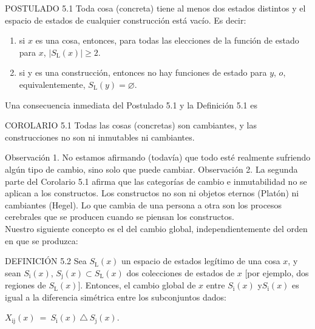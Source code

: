 \begin{justifying}
    \bigskip

    \noindent POSTULADO 5.1 Toda cosa (concreta) tiene al menos dos estados distintos y 
    el espacio de estados de cualquier construcción está vacío. Es decir:
    \begin{enumerate}[label=(\roman*), itemsep=0pt, parsep=0pt]
        \item si $x$ es una cosa, entonces, para todas las elecciones de la función de estado para $x$, $|S_\mathrm{L}(x)| \geq 2$.
        \item si y es una construcción, entonces no hay funciones de estado para $y$, $o$, equivalentemente, $S_\mathrm{L}(y) = \varnothing$.
    \end{enumerate}

    Una consecuencia inmediata del Postulado 5.1 y la Definición 5.1 es

    \bigskip

    \noindent COROLARIO 5.1 Todas las cosas (concretas) son cambiantes, y las construcciones
    no son ni inmutables ni cambiantes.

    Observación 1. No estamos afirmando (todavía) que todo esté realmente
    sufriendo algún tipo de cambio, sino solo que puede cambiar. Observación
    2. La segunda parte del Corolario 5.1 afirma que las categorías de cambio
    e inmutabilidad no se aplican a los constructos. Los constructos no son ni
    objetos eternos (Platón) ni cambiantes (Hegel). Lo que cambia
    de una persona a otra son los procesos cerebrales que se producen cuando se piensan los constructos. \\
	Nuestro siguiente concepto es el del cambio global, independientemente del orden en que se produzca:

    \bigskip

    \noindent DEFINICIÓN 5.2 Sea $S_\mathrm{L}(x)$ un espacio de estados legítimo de una cosa $x$, y sean $S_\mathrm{i}(x)$, 
    $S_\mathrm{j}(x) \subset S_\mathrm{L}(x)$ dos colecciones de estados de $x$ [por ejemplo, dos regiones de
    $S_\mathrm{L}(x)$]. Entonces, el cambio global de $x$ entre $S_\mathrm{i}(x)$ y$S_\mathrm{i}(x)$ es igual a la
    diferencia simétrica entre los subconjuntos dados:

	\medskip

	$X_\mathrm{ij}(x) \:= \:S_\mathrm{i}(x) \:\triangle \: S_\mathrm{j}(x)$.

	\medskip


\end{justifying}
